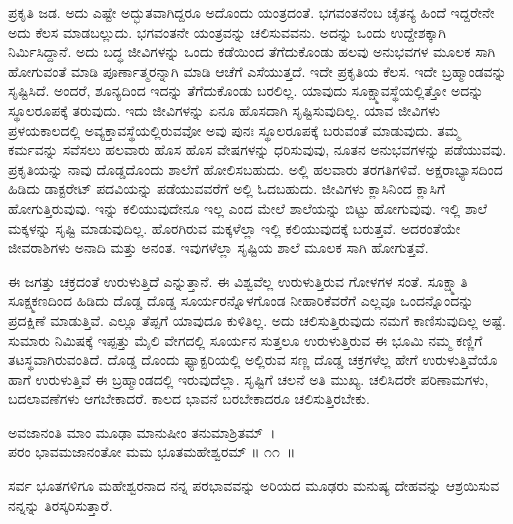 ಪ್ರಕೃತಿ ಜಡ. ಅದು ಎಷ್ಟೇ ಅದ್ಭುತವಾಗಿದ್ದರೂ ಅದೊಂದು ಯಂತ್ರದಂತೆ. ಭಗವಂತನೆಂಬ ಚೈತನ್ಯ ಹಿಂದೆ ಇದ್ದರೇನೇ ಅದು ಕೆಲಸ ಮಾಡಬಲ್ಲುದು. ಭಗವಂತನೇ ಯಂತ್ರವನ್ನು ಚಲಿಸು\-ವವನು. ಅದನ್ನು ಒಂದು ಉದ್ದೇಶಕ್ಕಾಗಿ ನಿರ್ಮಿಸಿದ್ದಾನೆ. ಅದು ಬದ್ಧ ಜೀವಿಗಳನ್ನು ಒಂದು ಕಡೆಯಿಂದ ತೆಗೆದುಕೊಂಡು ಹಲವು ಅನುಭವಗಳ ಮೂಲಕ ಸಾಗಿ ಹೋಗುವಂತೆ ಮಾಡಿ ಪೂರ್ಣಾತ್ಮ\-ರನ್ನಾಗಿ ಮಾಡಿ ಆಚೆಗೆ ಎಸೆಯುತ್ತದೆ. ಇದೇ ಪ್ರಕೃತಿಯ ಕೆಲಸ. ಇದೇ ಬ್ರಹ್ಮಾಂಡವನ್ನು ಸೃಷ್ಟಿಸಿದೆ. ಅಂದರೆ, ಶೂನ್ಯದಿಂದ ಇದನ್ನು ತೆಗೆದುಕೊಂಡು ಬರಲಿಲ್ಲ. ಯಾವುದು ಸೂಕ್ಷ್ಮಾವಸ್ಥೆಯಲ್ಲಿತ್ತೋ ಅದನ್ನು ಸ್ಥೂಲರೂಪಕ್ಕೆ ತರುವುದು. ಇದು ಜೀವಿಗಳನ್ನು ಏನೂ ಹೊಸದಾಗಿ ಸೃಷ್ಟಿಸುವುದಿಲ್ಲ. ಯಾವ ಜೀವಿಗಳು ಪ್ರಳಯಕಾಲದಲ್ಲಿ ಅವ್ಯಕ್ತಾವಸ್ಥೆಯಲ್ಲಿರುವವೋ ಅವು ಪುನಃ ಸ್ಥೂಲರೂಪಕ್ಕೆ ಬರುವಂತೆ ಮಾಡುವುದು. ತಮ್ಮ ಕರ್ಮವನ್ನು ಸವೆಸಲು ಹಲವಾರು ಹೊಸ ಹೊಸ ವೇಷಗಳನ್ನು ಧರಿಸುವುವು, ನೂತನ ಅನುಭವಗಳನ್ನು ಪಡೆಯುವವು. ಪ್ರಕೃತಿಯನ್ನು ನಾವು ದೊಡ್ಡದೊಂದು ಶಾಲೆಗೆ ಹೋಲಿಸಬಹುದು. ಅಲ್ಲಿ ಹಲವಾರು ತರಗತಿಗಳಿವೆ. ಅಕ್ಷರಾಭ್ಯಾಸದಿಂದ ಹಿಡಿದು ಡಾಕ್ಟರೇಟ್ ಪದವಿಯನ್ನು ಪಡೆಯುವವರೆಗೆ ಅಲ್ಲಿ ಓದಬಹುದು. ಜೀವಿಗಳು ಕ್ಲಾಸಿನಿಂದ ಕ್ಲಾಸಿಗೆ ಹೋಗುತ್ತಿರುವುವು. ಇನ್ನು ಕಲಿಯುವುದೇನೂ ಇಲ್ಲ ಎಂದ ಮೇಲೆ ಶಾಲೆಯನ್ನು ಬಿಟ್ಟು ಹೋಗುವುವು. ಇಲ್ಲಿ ಶಾಲೆ ಮಕ್ಕಳನ್ನು ಸೃಷ್ಟಿ ಮಾಡುವುದಿಲ್ಲ. ಹೊರಗಿರುವ ಮಕ್ಕಳೆಲ್ಲಾ ಇಲ್ಲಿ ಕಲಿಯುವುದಕ್ಕೆ ಬರುತ್ತವೆ. ಅದರಂತೆಯೇ ಜೀವರಾಶಿಗಳು ಅನಾದಿ ಮತ್ತು ಅನಂತ. ಇವುಗಳೆಲ್ಲಾ ಸೃಷ್ಟಿಯ ಶಾಲೆ ಮೂಲಕ ಸಾಗಿ ಹೋಗುತ್ತವೆ.

ಈ ಜಗತ್ತು ಚಕ್ರದಂತೆ ಉರುಳುತ್ತಿದೆ ಎನ್ನುತ್ತಾನೆ. ಈ ವಿಶ್ವವೆಲ್ಲ ಉರುಳುತ್ತಿರುವ ಗೋಳಗಳ ಸಂತೆ. ಸೂಕ್ಷ್ಮಾತಿ ಸೂಕ್ಷ್ಮಕಣದಿಂದ ಹಿಡಿದು ದೊಡ್ಡ ದೊಡ್ಡ ಸೂರ್ಯರನ್ನೊಳಗೊಂಡ ನೀಹಾರಿಕೆವರೆಗೆ ಎಲ್ಲವೂ ಒಂದನ್ನೊಂದನ್ನು ಪ್ರದಕ್ಷಿಣೆ ಮಾಡುತ್ತಿವೆ. ಎಲ್ಲೂ ತೆಪ್ಪಗೆ ಯಾವುದೂ ಕುಳಿತಿಲ್ಲ. ಅದು ಚಲಿಸುತ್ತಿರುವುದು ನಮಗೆ ಕಾಣಿಸುವುದಿಲ್ಲ ಅಷ್ಟೆ. ಸುಮಾರು ನಿಮಿಷಕ್ಕೆ ಇಪ್ಪತ್ತು ಮೈಲಿ ವೇಗದಲ್ಲಿ ಸೂರ್ಯನ ಸುತ್ತಲೂ ಉರುಳುತ್ತಿರುವ ಈ ಭೂಮಿ ನಮ್ಮ ಕಣ್ಣಿಗೆ ತಟಸ್ಥವಾಗಿರುವಂತಿದೆ. ದೊಡ್ಡ ದೊಂದು ಫ್ಯಾಕ್ಟರಿಯಲ್ಲಿ ಅಲ್ಲಿರುವ ಸಣ್ಣ ದೊಡ್ಡ ಚಕ್ರಗಳೆಲ್ಲ ಹೇಗೆ ಉರುಳುತ್ತಿವೆಯೊ ಹಾಗೆ ಉರುಳುತ್ತಿವೆ ಈ ಬ್ರಹ್ಮಾಂಡದಲ್ಲಿ ಇರುವುದೆಲ್ಲಾ. ಸೃಷ್ಟಿಗೆ ಚಲನೆ ಅತಿ ಮುಖ್ಯ. ಚಲಿಸಿದರೇ ಪರಿಣಾಮಗಳು, ಬದಲಾವಣೆಗಳು ಆಗಬೇಕಾದರೆ. ಕಾಲದ ಭಾವನೆ ಬರಬೇಕಾದರೂ ಚಲಿಸುತ್ತಿರಬೇಕು.

\begin{shloka}
ಅವಜಾನಂತಿ ಮಾಂ ಮೂಢಾ ಮಾನುಷೀಂ ತನುಮಾಶ್ರಿತಮ್~।\\ಪರಂ ಭಾವಮಜಾನಂತೋ ಮಮ ಭೂತಮಹೇಶ್ವರಮ್ \hfill॥ ೧೧~॥
\end{shloka}

\begin{artha}
ಸರ್ವ ಭೂತಗಳಿಗೂ ಮಹೇಶ್ವರನಾದ ನನ್ನ ಪರಭಾವವನ್ನು ಅರಿಯದ ಮೂಢರು ಮನುಷ್ಯ ದೇಹವನ್ನು ಆಶ್ರಯಿಸುವ ನನ್ನನ್ನು ತಿರಸ್ಕರಿಸುತ್ತಾರೆ.
\end{artha}

\newpage

